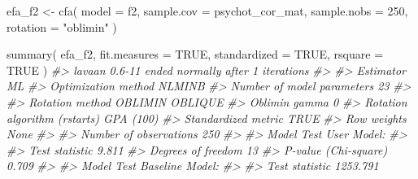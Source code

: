 \documentclass[
  11pt,
]{krantz}
\makeatletter
\newenvironment{Shaded}{\begin{snugshade}}{\end{snugshade}}
\newcommand{\AttributeTok}[1]{\textcolor[rgb]{0.61,0.61,0.61}{#1}}
\newcommand{\CommentTok}[1]{\textcolor[rgb]{0.37,0.37,0.37}{\textit{#1}}}
\newcommand{\ConstantTok}[1]{\textcolor[rgb]{0,0,0}{#1}}
\newcommand{\DecValTok}[1]{\textcolor[rgb]{0.06,0.06,0.06}{#1}}
\newcommand{\FunctionTok}[1]{\textcolor[rgb]{0,0,0}{#1}}
\newcommand{\NormalTok}[1]{#1}
\newcommand{\OtherTok}[1]{\textcolor[rgb]{0.37,0.37,0.37}{#1}}
\newcommand{\StringTok}[1]{\textcolor[rgb]{0.5,0.5,0.5}{#1}}
\newenvironment{kframe}{%
\medskip{}
\setlength{\fboxsep}{.8em}
 \def\at@end@of@kframe{}%
 \ifinner\ifhmode%
  \def\at@end@of@kframe{\end{minipage}}%
  \begin{minipage}{\columnwidth}%
 \fi\fi%
 \def\FrameCommand##1{\hskip\@totalleftmargin \hskip-\fboxsep
 \colorbox{shadecolor}{##1}\hskip-\fboxsep
     \hskip-\linewidth \hskip-\@totalleftmargin \hskip\columnwidth}%
 \MakeFramed {\advance\hsize-\width
   \@totalleftmargin\z@ \linewidth\hsize
   \@setminipage}}%
 {\par\unskip\endMakeFramed%
 \at@end@of@kframe}
\renewenvironment{Shaded}{\begin{kframe}}{\end{kframe}}
\theoremstyle{definition}
\theoremstyle{definition}
\theoremstyle{definition}
\theoremstyle{definition}
\theoremstyle{remark}
\makeatother
\begin{document}
\begin{Shaded}
\begin{Highlighting}[]
\NormalTok{efa\_f2 }\OtherTok{\textless{}{-}}
  \FunctionTok{cfa}\NormalTok{(}
    \AttributeTok{model =}\NormalTok{ f2,}
    \AttributeTok{sample.cov =}\NormalTok{ psychot\_cor\_mat,}
    \AttributeTok{sample.nobs =} \DecValTok{250}\NormalTok{,}
    \AttributeTok{rotation =} \StringTok{"oblimin"}
\NormalTok{  )}
\end{Highlighting}
\end{Shaded}

\begin{Shaded}
\begin{Highlighting}[]
\FunctionTok{summary}\NormalTok{(}
\NormalTok{  efa\_f2,}
  \AttributeTok{fit.measures =} \ConstantTok{TRUE}\NormalTok{,}
  \AttributeTok{standardized =} \ConstantTok{TRUE}\NormalTok{,}
  \AttributeTok{rsquare =} \ConstantTok{TRUE}
\NormalTok{)}
\CommentTok{\#\textgreater{} lavaan 0.6{-}11 ended normally after 1 iterations}
\CommentTok{\#\textgreater{} }
\CommentTok{\#\textgreater{}   Estimator                                         ML}
\CommentTok{\#\textgreater{}   Optimization method                           NLMINB}
\CommentTok{\#\textgreater{}   Number of model parameters                        23}
\CommentTok{\#\textgreater{}                                                       }
\CommentTok{\#\textgreater{}   Rotation method                      OBLIMIN OBLIQUE}
\CommentTok{\#\textgreater{}   Oblimin gamma                                      0}
\CommentTok{\#\textgreater{}   Rotation algorithm (rstarts)               GPA (100)}
\CommentTok{\#\textgreater{}   Standardized metric                             TRUE}
\CommentTok{\#\textgreater{}   Row weights                                     None}
\CommentTok{\#\textgreater{}                                                       }
\CommentTok{\#\textgreater{}   Number of observations                           250}
\CommentTok{\#\textgreater{}                                                       }
\CommentTok{\#\textgreater{} Model Test User Model:}
\CommentTok{\#\textgreater{}                                                       }
\CommentTok{\#\textgreater{}   Test statistic                                 9.811}
\CommentTok{\#\textgreater{}   Degrees of freedom                                13}
\CommentTok{\#\textgreater{}   P{-}value (Chi{-}square)                           0.709}
\CommentTok{\#\textgreater{} }
\CommentTok{\#\textgreater{} Model Test Baseline Model:}
\CommentTok{\#\textgreater{} }
\CommentTok{\#\textgreater{}   Test statistic                              1253.791}

\end{Highlighting}
\end{Shaded}
\end{document}
